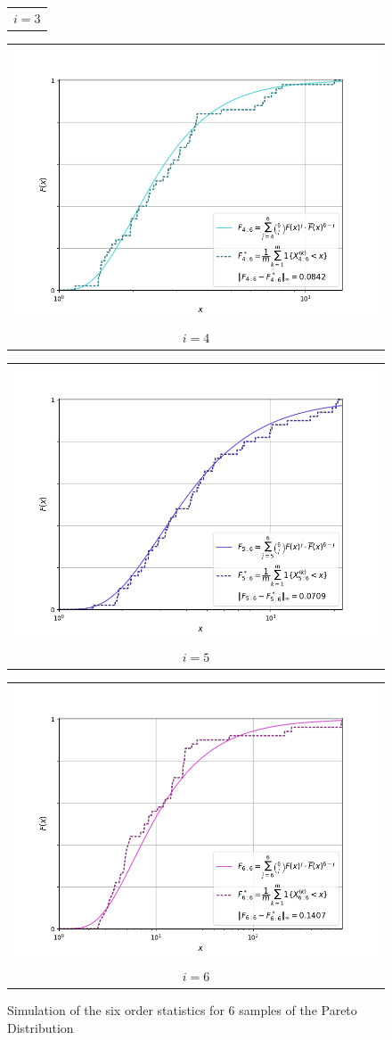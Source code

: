 \begin{figure}[H]
\begin{tabular}{@{}c@{}}
        $i = 3$
      \end{tabular}
    \begin{tabular}{@{}c@{}}
        \includegraphics[trim={1.1cm 0.5cm 1.5cm 0cm}, clip,width=.46\linewidth]{../simulation/pareto_order_4:6.png} \\
        $i = 4$
    \end{tabular}
    \begin{tabular}{@{}c@{}}
        \includegraphics[trim={1.1cm 0.5cm 1.5cm 0cm}, clip,width=.46\linewidth]{../simulation/pareto_order_5:6.png} \\
        $i = 5$
      \end{tabular}
    \begin{tabular}{@{}c@{}}
        \includegraphics[trim={1.1cm 0.5cm 1.5cm 0cm}, clip,width=.46\linewidth]{../simulation/pareto_order_6:6.png} \\
        $i = 6$
    \end{tabular}
    \caption{Simulation of the six order statistics for 6 samples of the Pareto Distribution}
\end{figure}
